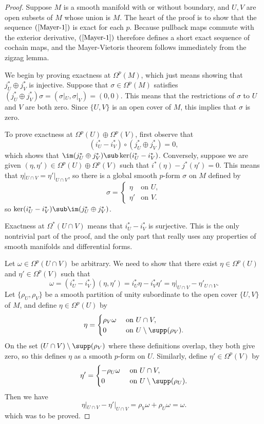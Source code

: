 \begin{proof}
Suppose $M$ is a smooth manifold with or without boundary, and $U,V$ are open subsets of $M$ whose union is $M$. The heart of the proof is to show that the sequence 
$(\ref{Mayer-1})$ is exact for each $p$. Because pullback maps commute with the exterior derivative, $(\ref{Mayer-1})$ therefore defines a short exact sequence of 
cochain maps, and the Mayer-Vietoris theorem follows immediately from the zigzag lemma.\par
We begin by proving exactness at $\Omega^p(M)$, which just means showing that $j_U^*\oplus j_V^*$ is injective. Suppose that $\sigma\in\Omega^p(M)$ satisfies 
$(j_U^*\oplus j_V^*)\sigma=(\sigma|_U,\sigma|_V)=(0,0)$. This means that the restrictions of $\sigma$ to $U$ and $V$ are both zero. Since $\{U,V\}$ is an open cover of 
$M$, this implies that $\sigma$ is zero.\par
To prove exactness at $\Omega^p(U)\oplus\Omega^p(V)$, first observe that
\[(i_U^*-i_V^*)\circ(j_U^*\oplus j_V^*)=0,\]
which shows that $\im(j_U^*\oplus j_V^*)\sub\ker(i_U^*-i_V^*)$. Conversely, suppose we are given $(\eta,\eta')\in\Omega^p(U)\oplus\Omega^p(V)$ such that 
$i^*(\eta)-j^*(\eta')=0$. This means that $\eta|_{U\cap V}=\eta'|_{U\cap V}$, so there is a global smooth $p$-form $\sigma$ on $M$ defined by
\[\sigma=\begin{cases}
\eta&\text{on }U,\\
\eta'&\text{on }V.
\end{cases}\]
so $\ker(i_U^*-i_V^*)\sub\im(j_U^*\oplus j_V^*)$.\par
Exactness at $\Omega^*(U\cap V)$ means that $i_U^*-i_V^*$ is surjective. This is the only nontrivial part of the proof, and the only part that really uses any properties of smooth manifolds and differential forms.\par
Let $\omega\in\Omega^p(U\cap V)$ be arbitrary. We need to show that there exist $\eta\in\Omega^p(U)$ and $\eta'\in\Omega^p(V)$ such that 
\[\omega=(i_U^*-i_V^*)(\eta,\eta')=i_U^*\eta-i_V^*\eta'=\eta|_{U\cap V}-\eta'_{U\cap V}.\]
Let $\{\rho_U,\rho_V\}$ be a smooth partition of unity subordinate to the open cover $\{U,V\}$ of $M$, and define $\eta\in\Omega^p(U)$ by
\[\eta=\begin{cases}
\rho_V\omega&\text{ on }U\cap V,\\
0&\text{ on }U\setminus\supp(\rho_V).
\end{cases}\]
On the set $(U\cap V)\setminus\supp(\rho_V)$ where these definitions overlap, they both give zero, so this defines $\eta$ as a smooth $p$-form on $U$. Similarly, define $\eta'\in\Omega^p(V)$ by
\[\eta'=\begin{cases}
-\rho_U\omega&\text{ on }U\cap V,\\
0&\text{ on }U\setminus\supp(\rho_U).
\end{cases}\]
Then we have
\[\eta|_{U\cap V}-\eta'|_{U\cap V}=\rho_V\omega+\rho_U\omega=\omega.\]
which was to be proved.
\end{proof}
